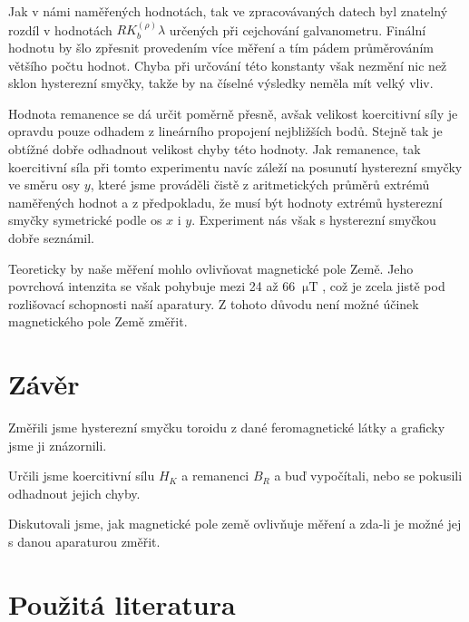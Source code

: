 \documentclass[english]{article}
\newcommand{\unit}[1]{\ \mathrm{#1}}
\begin{document}
			Jak v námi naměřených hodnotách, tak ve zpracovávaných datech byl znatelný rozdíl v hodnotách $RK_b^{(\rho)}\lambda$ určených při cejchování galvanometru. Finální hodnotu by šlo zpřesnit provedením více měření a tím pádem průměrováním většího počtu hodnot. Chyba při určování této konstanty však nezmění nic než sklon hysterezní smyčky, takže by na číselné výsledky neměla mít velký vliv. 
			
			Hodnota remanence se dá určit poměrně přesně, avšak velikost koercitivní síly je opravdu pouze odhadem z lineárního propojení nejbližších bodů. Stejně tak je obtížné dobře odhadnout velikost chyby této hodnoty. Jak remanence, tak koercitivní síla při tomto experimentu navíc záleží na posunutí hysterezní smyčky ve směru osy $y$, které jsme prováděli čistě z aritmetických průměrů extrémů naměřených hodnot a z předpokladu, že musí být hodnoty extrémů hysterezní smyčky symetrické podle os $x$ i $y$. Experiment nás však s hysterezní smyčkou dobře seznámil.
			
			Teoreticky by naše měření mohlo ovlivňovat magnetické pole Země. Jeho povrchová intenzita se však pohybuje mezi 24 až 66 $\unit{\mu T}$ \cite{bib:magpole}, což je zcela jistě pod rozlišovací schopnosti naší aparatury. Z tohoto důvodu není možné účinek magnetického pole Země změřit.
			
			
\section{Závěr}
		Změřili jsme hysterezní smyčku toroidu z dané feromagnetické látky a graficky jsme ji znázornili.
		
		Určili jsme koercitivní sílu $H_K$ a remanenci $B_R$ a buď vypočítali, nebo se pokusili odhadnout jejich chyby.
		
		Diskutovali jsme, jak magnetické pole země ovlivňuje měření a zda-li je možné jej s danou aparaturou změřit.		
	
\section {Použitá literatura}
\begingroup
\renewcommand{\section}[2]{}
\end{document}
